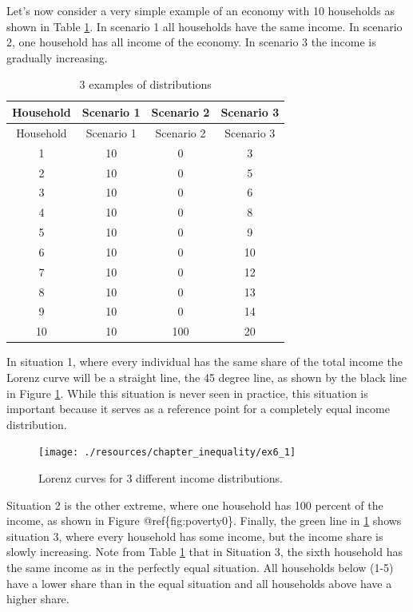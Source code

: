 \documentclass[
]{book}
\begin{document}
Let's now consider a very simple example of an economy with 10 households as shown in Table \ref{tab:povt1}. In scenario 1 all households have the same income. In scenario 2, one household has all income of the economy. In scenario 3 the income is gradually increasing.

\begin{longtable}[]{@{}cccc@{}}
\caption{\label{tab:povt1} 3 examples of distributions}\tabularnewline
\toprule
Household & Scenario 1 & Scenario 2 & Scenario 3 \\
\midrule
\endfirsthead
\toprule
Household & Scenario 1 & Scenario 2 & Scenario 3 \\
\midrule
\endhead
1 & 10 & 0 & 3 \\
2 & 10 & 0 & 5 \\
3 & 10 & 0 & 6 \\
4 & 10 & 0 & 8 \\
5 & 10 & 0 & 9 \\
6 & 10 & 0 & 10 \\
7 & 10 & 0 & 12 \\
8 & 10 & 0 & 13 \\
9 & 10 & 0 & 14 \\
10 & 10 & 100 & 20 \\
\bottomrule
\end{longtable}

In situation 1, where every individual has the same share of the total income the Lorenz curve will be a straight line, the 45 degree line, as shown by the black line in Figure \ref{fig:poverty0}. While this situation is never seen in practice, this situation is important because it serves as a reference point for a completely equal income distribution.

\begin{figure}

{\centering \texttt{[image: ./resources/chapter\_inequality/ex6\_1]} 

}

\caption{Lorenz curves for 3 different income distributions.}\label{fig:poverty0}
\end{figure}

Situation 2 is the other extreme, where one household has 100 percent of the income, as shown in Figure @ref\{fig:poverty0\}. Finally, the green line in \ref{fig:poverty0} shows situation 3, where every household has some income, but the income share is slowly increasing. Note from Table \ref{tab:povt1} that in Situation 3, the sixth household has the same income as in the perfectly equal situation. All households below (1-5) have a lower share than in the equal situation and all households above have a higher share.
\end{document}
